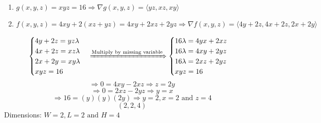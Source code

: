 \documentclass[letter,11pt]{article}
\begin{document}
\begin{enumerate}[label=\roman*.]
    \item $g(x,y,z) = xyz=16 \Longrightarrow \nabla g(x,y,z)= \langle yz, xz,xy\rangle$
    \item $f(x,y,z) = 4xy+2(xz+yz) = 4xy+2xz+2yz \Longrightarrow \nabla f(x,y,z) = \langle 4y+2z, 4x+2z, 2x+2y\rangle$
\end{enumerate}

$$
\begin{cases}
4y+2z = yz\lambda\\
4x+2z = xz\lambda \\
2x+2y = xy\lambda \\
xyz = 16
\end{cases}
\xRightarrow[]{\text{Multiply by missing variable}}
\begin{cases}
16\lambda = 4yx+2xz\\
16\lambda = 4xy+2yz\\
16\lambda = 2xz+2yz\\
xyz = 16
\end{cases}
$$
$$\Longrightarrow 0 = 4xy-2xz \Longrightarrow z=2y$$
$$\Longrightarrow 0 = 2xz-2yz \Longrightarrow y =x$$
$$\Longrightarrow 16=(y)(y)(2y) \Longrightarrow y = 2, x=2 \text{ and } z = 4$$
$$(2,2,4)$$
Dimensions: $\boxed{W= 2, L =2 \text{ and } H= 4}$
\end{document}
